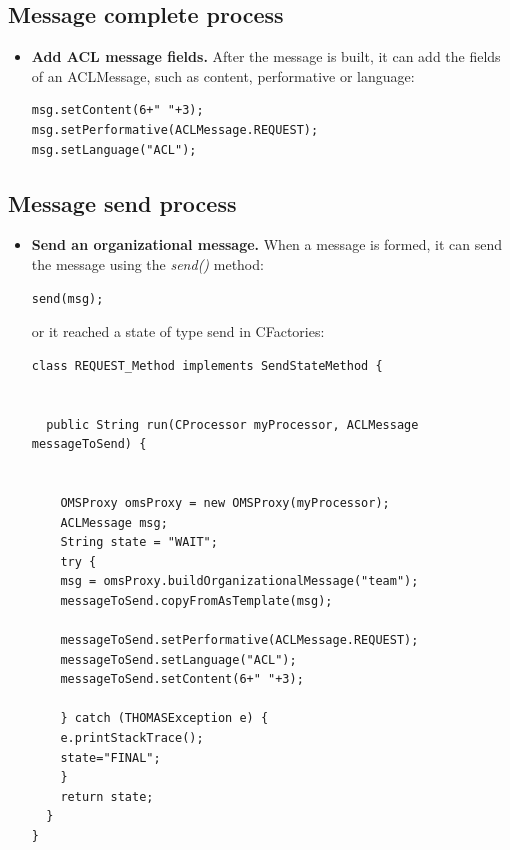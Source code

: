 \subsection{Message complete process}
\begin{itemize}
\item \textbf{Add ACL message fields.} After the message is built, it can add the fields of an ACLMessage, such as content, performative or language:
\begin{lstlisting}
msg.setContent(6+" "+3);
msg.setPerformative(ACLMessage.REQUEST);
msg.setLanguage("ACL");
\end{lstlisting}
\end{itemize}
\subsection{Message send process}
\begin{itemize}
\item \textbf{Send an organizational message.} When a message is formed, it can send the message using the \textit{send()} method:

\begin{lstlisting}
send(msg);
\end{lstlisting}
or it reached a state of type send in CFactories: 
\begin{lstlisting}
class REQUEST_Method implements SendStateMethod {
  

  public String run(CProcessor myProcessor, ACLMessage messageToSend) {


    OMSProxy omsProxy = new OMSProxy(myProcessor);
    ACLMessage msg;
    String state = "WAIT";
    try {
	msg = omsProxy.buildOrganizationalMessage("team");
	messageToSend.copyFromAsTemplate(msg);

	messageToSend.setPerformative(ACLMessage.REQUEST);
	messageToSend.setLanguage("ACL");
	messageToSend.setContent(6+" "+3);

    } catch (THOMASException e) {
	e.printStackTrace();
	state="FINAL";
    }
    return state;
  }
}
\end{lstlisting}

\end{itemize}

